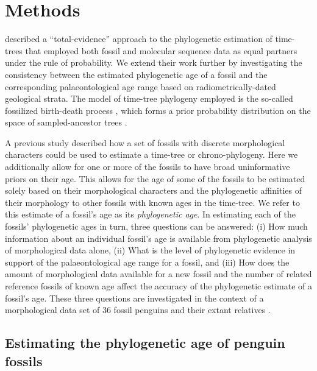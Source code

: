 \documentclass[11pt]{article}
\begin{document}
\section*{Methods}

\textcite{gavryushkina2015bayesian} described a ``total-evidence'' approach to the phylogenetic estimation of time-trees that employed both fossil and molecular sequence data as equal partners under the rule of probability. We extend their work further by investigating the consistency between the estimated phylogenetic age of a fossil and the corresponding palaeontological age range based on radiometrically-dated geological strata. The model of time-tree phylogeny employed is the so-called fossilized birth-death process \autocite{Heath2014}, which forms a prior probability distribution on the space of sampled-ancestor trees \autocite{Gavr2013}.

A previous study described how a set of fossils with discrete morphological characters could be used to estimate a time-tree or chrono-phylogeny. Here we additionally allow for one or more of the fossils to have broad uninformative priors on their age. This allows for the age of some of the fossils to be estimated solely based on their morphological characters and the phylogenetic affinities of their morphology to other fossils with known ages in the time-tree. We refer to this estimate of a fossil's age as its {\em phylogenetic age}. In estimating each of the fossils' phylogenetic ages in turn, three questions can be answered: (i) How much information about an individual fossil's age is available from phylogenetic analysis of morphological data alone, (ii) What is the level of phylogenetic evidence in support of the palaeontological age range for a fossil, and (iii) How does the amount of morphological data available for a new fossil and the number of related reference fossils of known age affect the accuracy of the phylogenetic estimate of a fossil's age. These three questions are investigated in the context of a morphological data set of 36 fossil penguins and their extant relatives \autocite{ksepka2010,ksepka2012,gavryushkina2015bayesian}.

\subsection*{Estimating the phylogenetic age of penguin fossils}
\end{document}
